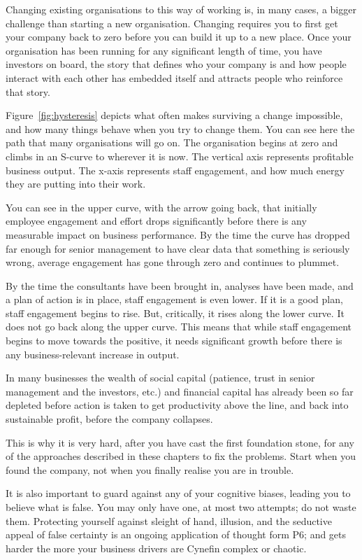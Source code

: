 Changing existing organisations to this way of working is, in many cases, a bigger challenge than starting a new organisation. Changing requires you to first get your company back to zero before you can build it up to a new place. Once your organisation  has been running for any significant length of time, you have investors on board, the story that defines who your company is and how people interact with each other has embedded itself and attracts people who reinforce that story. 


Figure~\ref{fig:hysteresis} depicts what often makes surviving a change impossible, and how many things behave when you try to change them. You can see here the path that many organisations will go on. The organisation begins at zero and climbs in an S-curve to wherever it is now. The vertical axis represents profitable business output. The x-axis represents staff engagement, and how much energy they are putting into their work.


You can see in the upper curve, with the arrow going back, that initially employee engagement and effort drops significantly before there is any measurable impact on business performance. By the time the curve has dropped far enough for senior management to have clear data that something is seriously wrong, average engagement has gone through zero and continues to plummet.


By the time the consultants have been brought in, analyses have been made, and a plan of action is in place, staff engagement is even lower. If it is a good plan, staff engagement begins to rise. But, critically, it rises along the lower curve. It does not go back along the upper curve. This means that while staff engagement begins to move towards the positive, it needs significant growth before there is any business-relevant increase in output.


In many businesses the wealth of social capital (patience, trust in senior management and the investors, etc.) and financial capital has already been so far depleted before action is taken to get productivity above the line, and back into sustainable profit, before the company collapses. 


This is why it is very hard, after you have cast the first foundation stone, for any of the approaches described in these chapters to fix the problems. Start when you found the company, not when you finally realise you are in trouble.


It is also important to guard against any of your cognitive biases, leading you to believe what is false\cite{wiseman-paranormality}. You may only have one, at most two attempts; do not waste them. Protecting yourself against sleight of hand, illusion, and the seductive appeal of false certainty\cite{kuhn-magic} is an ongoing application of thought form P6; and gets harder the more your business drivers are Cynefin complex or chaotic.


